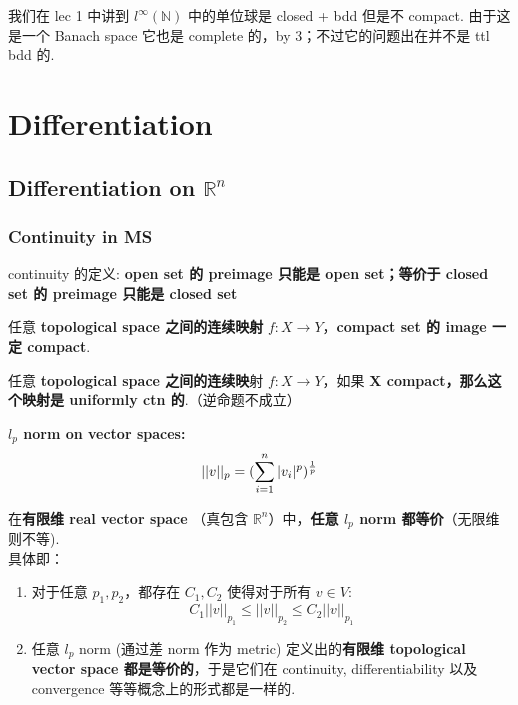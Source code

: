 \documentclass[lang=cn,11pt]{elegantbook}
\begin{document}
\begin{remark}
    我们在 lec 1 中讲到  $l^{\infty}(\mathbb{N})$ 中的单位球是 closed + bdd 但是不 compact. 由于这是一个 Banach space 它也是 complete 的，by 3；不过它的问题出在并不是 ttl bdd 的.
\end{remark}


\chapter{Differentiation}
\section{Differentiation on $\mathbb{R}^n$}
\subsection{Continuity in MS}
\begin{remark}
    continuity 的定义: \textbf{open set 的 preimage 只能是 open set；等价于 closed set 的 preimage 只能是 closed set}
\end{remark}


\begin{theorem}
任意\textbf{ topological space 之间的连续映射} $ f:X \rightarrow Y$，\textbf{compact set 的 image 一定 compact}.
\end{theorem}

\begin{theorem}
任意 \textbf{topological space 之间的连续映}射 $f:X \rightarrow Y$，如果 \textbf{X compact，那么这个映射是 uniformly ctn 的}.（逆命题不成立）
\end{theorem}

\begin{definition}
    \textbf{$l_p$ norm on vector spaces:}\\
$$||v||_p = (\sum_{i = 1}^n |v_i|^p)^{1\over p}$$
\end{definition}

\begin{theorem}
    在\textbf{有限维 real vector space} （真包含 $\mathbb{R}^n$）中，\textbf{任意 $l_p$ norm 都等价}（无限维则不等).\\
    具体即：
    \begin{enumerate}
        \item 对于任意 $p_1, p_2$，都存在 $C_1, C_2$ 使得对于所有 $v\in V$:
        $$
        C_1||v||_{p_1} \leq ||v||_{p_2} \leq C_2||v||_{p_1}
        $$
        \item 任意 $l_p$ norm (通过差 norm 作为 metric) 定义出的\textbf{有限维 topological vector space 都是等价的}，于是它们在 continuity, differentiability 以及 convergence 等等概念上的形式都是一样的.
    \end{enumerate}
\end{theorem}
\end{document}
